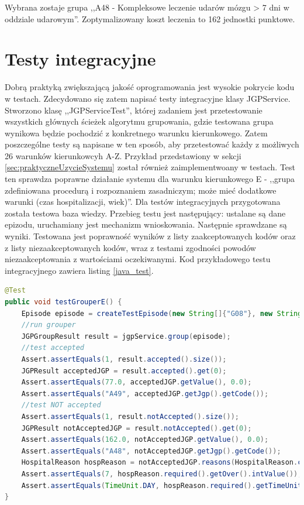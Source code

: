 Wybrana zostaje grupa ,,A48 - Kompleksowe leczenie udarów mózgu > 7 dni w oddziale udarowym''. Zoptymalizowany koszt leczenia to 162 jednostki punktowe.


\section{Testy integracyjne}
\label{sec:testyIntegracyjne}

Dobrą praktyką zwiększającą jakość oprogramowania jest wysokie pokrycie kodu w testach. Zdecydowano się zatem napisać testy integracyjne klasy JGPService. Stworzono klasę ,,JGPServiceTest'', której zadaniem jest przetestowanie wszystkich głównych ścieżek algorytmu grupowania, gdzie testowana grupa wynikowa będzie pochodzić z konkretnego warunku kierunkowego. Zatem poszczególne testy są napisane w ten sposób, aby przetestować każdy z możliwych 26 warunków kierunkowcyh A-Z.
Przykład przedstawiony w sekcji \ref{sec:praktyczneUzycieSystemu} został również zaimplementwoany w testach. Test ten sprawdza poprawne działanie systemu dla warunku kierunkowego E - ,,grupa zdefiniowana procedurą i rozpoznaniem zasadniczym; może mieć dodatkowe warunki (czas hospitalizacji, wiek)''.
Dla testów integracyjnych przygotowana została testowa baza wiedzy. Przebieg testu jest następujący: ustalane są dane epizodu, uruchamiany jest mechanizm wnioskowania. Następnie sprawdzane są wyniki. Testowana jest poprawność wyników z listy zaakceptowanych kodów oraz z listy niezaakceptowanych kodów, wraz z testami zgodności powodów niezaakceptowania z wartościami oczekiwanymi.
Kod przykładowego testu integracyjnego zawiera listing \ref{java_test}.

\newpage
\begin{lstlisting}[language=Java,caption={Test integracyjny sprawdzający warunek kierunkowy ,,E''. Autor: Mateusz Urbanik},label=java_test]
@Test
public void testGrouperE() {
    Episode episode = createTestEpisode(new String[]{"G08"}, new String[]{"88.714"}, 7, 75);
    //run grouper
    JGPGroupResult result = jgpService.group(episode);
    //test accepted
    Assert.assertEquals(1, result.accepted().size());
    JGPResult acceptedJGP = result.accepted().get(0);
    Assert.assertEquals(77.0, acceptedJGP.getValue(), 0.0);
    Assert.assertEquals("A49", acceptedJGP.getJgp().getCode());
    //test NOT accepted
    Assert.assertEquals(1, result.notAccepted().size());
    JGPResult notAcceptedJGP = result.notAccepted().get(0);
    Assert.assertEquals(162.0, notAcceptedJGP.getValue(), 0.0);
    Assert.assertEquals("A48", notAcceptedJGP.getJgp().getCode());
    HospitalReason hospReason = notAcceptedJGP.reasons(HospitalReason.class).get(0);
    Assert.assertEquals(7, hospReason.required().getOver().intValue());
    Assert.assertEquals(TimeUnit.DAY, hospReason.required().getTimeUnit());
}
\end{lstlisting}

